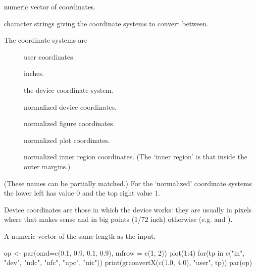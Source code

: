 %
\begin{Arguments}
\begin{ldescription}
\item[\code{x, y}] numeric vector of coordinates.
\item[\code{from, to}] character strings giving the coordinate systems to
convert between.
\end{ldescription}
\end{Arguments}
%
\begin{Details}\relax
The coordinate systems are
\begin{description}

\item[] user coordinates.
\item[] inches.
\item[] the device coordinate system.
\item[] normalized device coordinates.
\item[] normalized figure coordinates.
\item[] normalized plot coordinates.
\item[] normalized inner region coordinates.  (The
`inner region' is that inside the outer margins.)

\end{description}

(These names can be partially matched.)  For the `normalized'
coordinate systems the lower left has value 0 and the top right
value 1.

Device coordinates are those in which the device works: they are
usually in pixels where that makes sense and in big points (1/72 inch)
otherwise (e.g.  and ).
\end{Details}
%
\begin{Value}
A numeric vector of the same length as the input.
\end{Value}
%
\begin{Examples}
\begin{ExampleCode}
op <- par(omd=c(0.1, 0.9, 0.1, 0.9), mfrow = c(1, 2))
plot(1:4)
for(tp in c("in", "dev", "ndc", "nfc", "npc", "nic"))
    print(grconvertX(c(1.0, 4.0), "user", tp))
par(op)
\end{ExampleCode}
\end{Examples}
